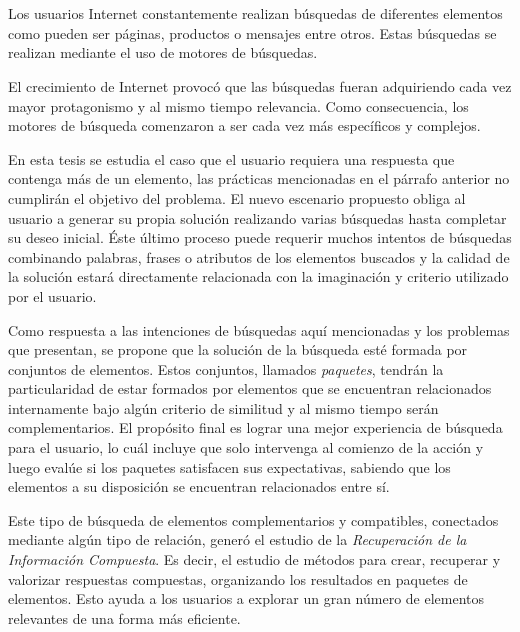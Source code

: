 \chapter*{\runtitulo}

\noindent 

Los usuarios Internet constantemente realizan búsquedas de diferentes elementos como pueden ser páginas, productos o mensajes entre otros. Estas búsquedas se realizan mediante el uso de motores de búsquedas.

El crecimiento de Internet provocó que las búsquedas fueran adquiriendo cada vez mayor protagonismo y al mismo tiempo relevancia. Como consecuencia, los motores de búsqueda comenzaron a ser cada vez más específicos y complejos.

En esta tesis se estudia el caso que el usuario requiera una respuesta que contenga más de un elemento, las prácticas mencionadas en el párrafo anterior no cumplirán el objetivo del problema. El nuevo escenario propuesto obliga al usuario a generar su propia solución realizando varias búsquedas hasta completar su deseo inicial. Éste último proceso puede requerir muchos intentos de búsquedas combinando palabras, frases o atributos de los elementos buscados y la calidad de la solución estará directamente relacionada con la imaginación y criterio utilizado por el usuario.

Como respuesta a las intenciones de búsquedas aquí mencionadas y los problemas que presentan, se propone que la solución de la búsqueda esté formada por conjuntos de elementos. Estos conjuntos, llamados {\em paquetes}, tendrán la particularidad de estar formados por elementos que se encuentran relacionados internamente bajo algún criterio de similitud y al mismo tiempo serán complementarios. El propósito final es lograr una mejor experiencia de búsqueda para el usuario, lo cuál incluye que solo intervenga al comienzo de la acción y luego evalúe si los paquetes satisfacen sus expectativas, sabiendo que los elementos a su disposición se encuentran relacionados entre sí.

Este tipo de búsqueda de elementos complementarios y compatibles, conectados mediante algún tipo de relación, generó el estudio de la {\em Recuperación de la Información Compuesta}. Es decir, el estudio de métodos para crear, recuperar y valorizar respuestas compuestas, organizando los resultados en paquetes de elementos. Esto ayuda a los usuarios a explorar un gran número de elementos relevantes de una forma más eficiente.


